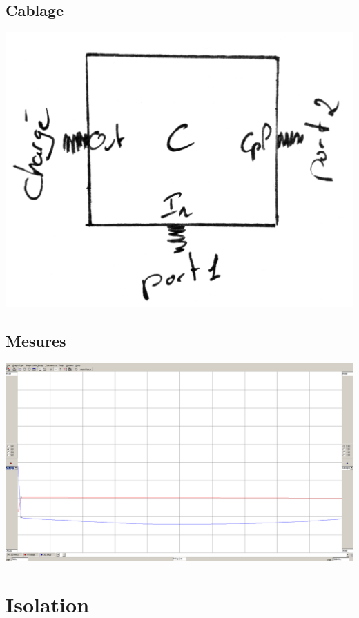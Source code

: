 \documentclass[a4paper,12pt]{report}            %
\begin{document}
\subsection{Cablage}
\begin{center}\includegraphics[scale = 0.17]{pic/CDIC.png}\\ \end{center}

\subsection{Mesures}
\begin{center}\includegraphics[scale = 0.25]{pic/Couplage_CD.png} \\\end{center}

\section{Isolation}
\end{document}
